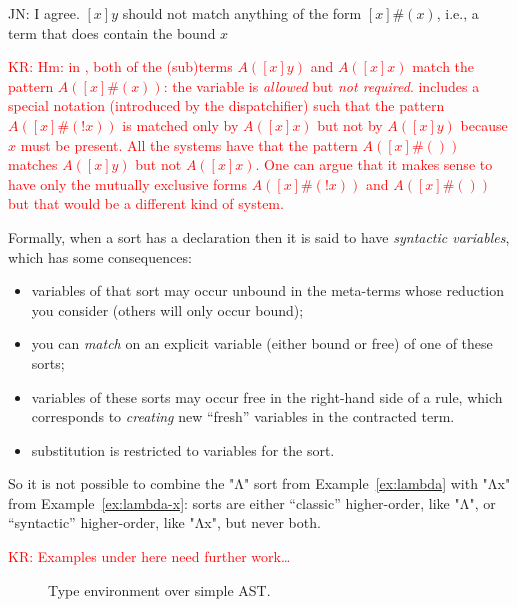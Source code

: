 \documentclass[letterpaper,11pt]{article}
\newcommand{\KR}[1]{\textcolor{red}{KR: #1}}
\newcommand{\JN}[1]{\textcolor{orange!70!black}{JN: #1}}
\begin{document}
\JN{I agree. $[x]y$ should not match anything of the form $[x]\#(x)$, i.e., a term that does contain
  the bound $x$}

\KR{Hm: in \CRSX, both of the (sub)terms $A([x]y)$ and $A([x]x)$ match the pattern $A([x]\#(x))$:
  the variable is \emph{allowed} but \emph{not required}. \CRSX3 includes a special notation
  (introduced by the dispatchifier) such that the pattern $A([x]\#(!x))$ is matched only by
  $A([x]x)$ but not by $A([x]y)$ because $x$ must be present. All the systems have that the pattern
  $A([x]\#())$ matches $A([x]y)$ but not $A([x]x)$. One can argue that it makes sense to have only
  the mutually exclusive forms $A([x]\#(!x))$ and $A([x]\#())$ but that would be a different kind of
  system.}

Formally, when a sort has a  declaration then it is said to have \emph{syntactic
  variables}, which has some consequences:
\begin{itemize}

\item variables of that sort may occur unbound in the meta-terms whose reduction you consider
  (others will only occur bound);

\item you can \emph{match} on an explicit variable (either bound or free) of one of these sorts;

\item variables of these sorts may occur free in the right-hand side of a rule, which corresponds to
  \emph{creating} new ``fresh'' variables in the contracted term.

\item substitution is restricted to variables for the sort.

\end{itemize}
So it is not possible to combine the "Λ" sort from Example~\ref{ex:lambda} with "Λx" from
Example~\ref{ex:lambda-x}: sorts are either ``classic'' higher-order, like "Λ", or ``syntactic''
higher-order, like "Λx", but never both.





\KR{Examples under here need further work…}

\begin{figure}[h!t]
  \caption{Type environment over simple AST.}
  \label{fig:te}
\end{figure}
\end{document}
